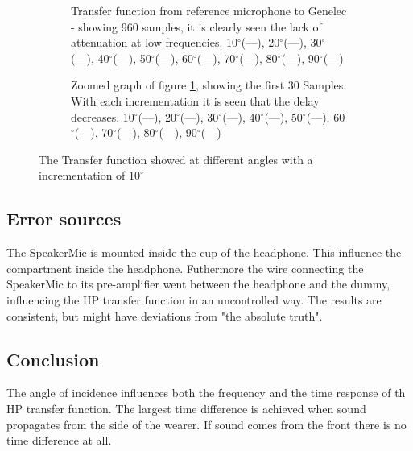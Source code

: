 \begin{figure}[H]
	\centering
	\begin{subfigure}[b]{\textwidth}
	
	\caption{Transfer function from reference microphone to Genelec - showing 960 samples, it is clearly seen the lack of attenuation at low frequencies.
		10$^\circ$(\textcolor{MATLABblue}{---}), 
		20$^\circ$(\textcolor{MATLABorange}{---}), 	
		30$^\circ$(\textcolor{MATLAByellow}{---}), 	
		40$^\circ$(\textcolor{MATLABpurple}{---}), 	
		50$^\circ$(\textcolor{MATLABgreen}{---}), 	
		60$^\circ$(\textcolor{MATLABbabyblue}{---}), 	
		70$^\circ$(\textcolor{MATLABred}{---}), 	
		80$^\circ$(\textcolor{MATLABblue}{---}), 	
		90$^\circ$(\textcolor{MATLABorange}{---})			
		}
	\label{Fig:AngOfIncTime}
	\end{subfigure} 
	\begin{subfigure}[b]{\textwidth}
	
	\caption{Zoomed graph of figure \ref{Fig:AngOfIncTime}, showing the first 30 Samples. With each incrementation it is seen that the delay decreases.
		10$^\circ$(\textcolor{MATLABblue}{---}), 
		20$^\circ$(\textcolor{MATLABorange}{---}), 	
		30$^\circ$(\textcolor{MATLAByellow}{---}), 	
		40$^\circ$(\textcolor{MATLABpurple}{---}), 	
		50$^\circ$(\textcolor{MATLABgreen}{---}), 	
		60$^\circ$(\textcolor{MATLABbabyblue}{---}), 	
		70$^\circ$(\textcolor{MATLABred}{---}), 	
		80$^\circ$(\textcolor{MATLABblue}{---}), 	
		90$^\circ$(\textcolor{MATLABorange}{---})			
		}
	\label{Fig:AngOfIncTimezoom2}
	\end{subfigure}
	\caption{The Transfer function showed at different angles with a incrementation of $10^{\circ}$}
	\label{fig:AngOfIncResult}
\end{figure}

\subsection{Error sources}
The SpeakerMic is mounted inside the cup of the headphone. This influence the compartment inside the headphone. Futhermore the wire connecting the SpeakerMic to its pre-amplifier went between the headphone and the dummy, influencing the HP transfer function in an uncontrolled way. The results are consistent, but might have deviations from "the absolute truth".

\subsection{Conclusion}
The angle of incidence influences both the frequency and the time response of th HP transfer function.  The largest time difference is achieved when sound propagates from the side of the wearer. If sound comes from the front there is no time difference at all. 